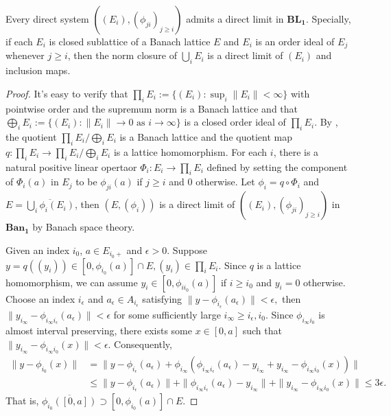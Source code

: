 \begin{theorem}\label{direct_limit}
Every direct system $((E_i),(\phi_{ji})_{j\geq i})$ admits a direct limit in $\mathbf{BL_1}$. Specially, if each $E_i$ is closed sublattice of a Banach lattice $E$ and $E_i$ is an order ideal of $E_j$ whenever $j\geq i$, then the norm closure of $\bigcup_iE_i$ is a direct limit of $(E_i)$ and inclusion maps.
\end{theorem} 
\begin{proof}
    It's easy to verify that $\prod_{i}E_i:=\{(E_i):\sup_{i}{\|E_i\|}<\infty\}$ with pointwise order and the supremum norm is a Banach lattice and that $\bigoplus_{i}E_i:=\{(E_i):\|E_i\|\to 0 \mbox{ as } i\to\infty\}$ is a closed order ideal of $\prod_{i}E_i$. By \cite[Proposition 1.3.13]{meyer-nieberg_BANACH_LATTICES:1991}, the quotient $\prod_{i}E_i/\bigoplus_{i}E_i$ is a Banach lattice and the quotient map $q:\prod_{i}E_i\to \prod_{i}E_i/\bigoplus_{i}E_i$ is a lattice homomorphism.
For each $i$, there is a natural positive linear opertaor $\Phi_i:E_i\to \prod_{i}E_i$ defined by setting the component of $\Phi_i(a)$ in $E_j$ to be $\phi_{ji}(a)$ if $j\geq i$ and $0$ otherwise. 
Let $\phi_i=q\circ\Phi_i$ and $E=\overline{\bigcup_{i}\phi_i(E_i)}$, then $(E,(\phi_i))$ is a direct limit of  $((E_i),(\phi_{ji})_{j\geq i})$ in $\mathbf{Ban_1}$ by Banach space theory.

Given an index $i_0$, $a\in E_{i_0+}$ and $\epsilon>0$. Suppose $y=q((y_i))\in [0,\phi_{i_0}(a)]\cap E, (y_i)\in \prod_{i}E_i$. Since $q$ is a lattice homomorphism, we can assume $y_i\in [0,\phi_{ii_0}(a)]$ if $i\geq i_0$ and $y_i=0$ otherwise.
	Choose an index $i_\epsilon$ and $a_\epsilon\in A_{i_\epsilon}$ satisfying
	$\|y-\phi_{i_\epsilon}(a_\epsilon)\|< \epsilon,$
	then
	$\|y_{i_\infty}-\phi_{i_\infty i_\epsilon}(a_\epsilon)\|<\epsilon$
	for some sufficiently large $i_\infty\geq i_\epsilon, i_0$.
	Since $\phi_{i_\infty i_0}$ is almost interval preserving, 
	there exists some $x\in [0, a]$ such that
	$\|y_{i_\infty}-\phi_{i_\infty i_0}(x)\|<\epsilon$.
	Consequently, 
	\begin{align*}
	\|y-\phi_{i_0}(x)\|
	& =\|y-\phi_{i_\epsilon}(a_\epsilon)+\phi_{i_\infty}(\phi_{i_\infty i_\epsilon}(a_\epsilon)-y_{i_\infty}+y_{i_\infty}-\phi_{i_\infty i_0}(x))\|\\
	& \leq \|y-\phi_{i_\epsilon}(a_\epsilon)\|+\|\phi_{i_\infty i_\epsilon}(a_\epsilon)-y_{i_\infty}\|+\|y_{i_\infty}-\phi_{i_\infty i_0}(x)\|\leq  3\epsilon.
	\end{align*}
	That is, $\overline{\phi_{i_0}([0,a])}\supset [0,\phi_{i_0}(a)]\cap E$.
	

\end{proof}
